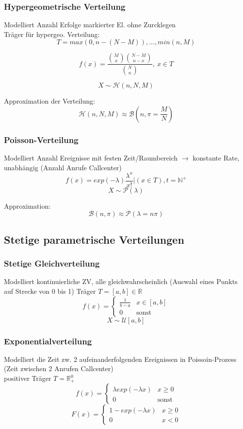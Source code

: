 \documentclass[10pt,a4paper,landscape]{article}
\begin{document}
\begin{multicols}{4}
\subsubsection{Hypergeometrische Verteilung}
Modelliert Anzahl Erfolge markierter El. ohne Zurcklegen \\
Träger für hypergeo. Verteilung:
\[
T={max(0, n-(N-M)), ...,min(n,M)}
\]

\[
f(x)=\frac{\binom{M}{x} \binom{N-M}{n-x}}{\binom{N}{n}},~ x \in T
\]

\[
X \sim \mathcal{H}(n,N,M)
\]

Approximation der Verteilung:
\[
\mathcal{H}(n,N,M) \approx \mathcal{B}\left(n, \pi = \frac{M}{N}\right)
\]

\subsubsection{Poisson-Verteilung}
Modelliert Anzahl Ereignisse mit festen Zeit/Raumbereich $\rightarrow$ konstante Rate, unabhängig (Anzahl Anrufe Callcenter)
\[
f(x)=exp(-\lambda)\frac{\lambda^x}{x!}|(x \in T), t= \mathbb{N^+}
\]
\[
X \sim \mathcal{P}(\lambda)
\]

Approximation:
\[
\mathcal{B}(n, \pi) \approx \mathcal{P}(\lambda =n\pi)
\]

\subsection{Stetige parametrische Verteilungen}

\subsubsection{Stetige Gleichverteilung}
Modelliert kontinuierliche ZV, alle gleichwahrscheinlich (Auswahl eines Punkts auf Strecke von 0 bis 1)
Träger $T=[a,b] \in \mathbb{R}$
\[
f(x) = \begin{cases}
\frac{1}{b-a} &x\in [a,b] \\
0 &\text{sonst}
\end{cases}
\]
\[
X \sim \mathcal{U}[a,b]
\]

\subsubsection{Exponentialverteilung}
Modelliert die Zeit zw. 2 aufeinanderfolgenden Ereignissen in Poissoin-Prozess (Zeit zwischen 2 Anrufen Callcenter) \\
positiver Träger $T=\mathbb{R}_+^0$
\[
f(x)= \begin{cases}
\lambda exp(-\lambda x) &x \geq 0 \\
0 &\text{sonst}
\end{cases}
\]
\[
F(x)= \begin{cases}
1-exp(-\lambda x) &x\geq 0\\
0 &x<0
\end{cases}
\]


\end{multicols}
\end{document}
